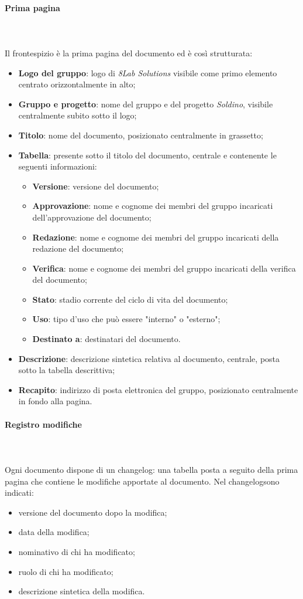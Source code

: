 		\paragraph{Prima pagina} \mbox{}\\ \mbox{}\\
		Il frontespizio è la prima pagina del documento ed è così strutturata:
		\begin{itemize}
			\item \textbf{Logo del gruppo}: logo di \textit{8Lab Solutions} visibile come primo elemento centrato orizzontalmente in alto;
			\item \textbf{Gruppo e progetto}: nome del gruppo e del progetto \textit{Soldino}, visibile centralmente subito sotto il logo;
			\item \textbf{Titolo}: nome del documento, posizionato centralmente in grassetto;
			\item \textbf{Tabella}: presente sotto il titolo del documento, centrale e contenente le seguenti informazioni:
			\begin{itemize}
				\item \textbf{Versione}: versione del documento;
				\item \textbf{Approvazione}: nome e cognome dei membri del gruppo incaricati dell'approvazione del documento;
				\item \textbf{Redazione}: nome e cognome dei membri del gruppo incaricati della redazione del documento;
				\item \textbf{Verifica}: nome e cognome dei membri del gruppo incaricati della verifica del documento;
				\item \textbf{Stato}: stadio corrente del ciclo di vita del documento;
				\item \textbf{Uso}: tipo d'uso che può essere "interno" o "esterno";
				\item \textbf{Destinato a}: destinatari del documento.
			\end{itemize}
			\item \textbf{Descrizione}: descrizione sintetica relativa al documento, centrale, posta sotto la tabella descrittiva;
			\item \textbf{Recapito}: indirizzo di posta elettronica del gruppo, posizionato centralmente in fondo alla pagina.
		\end{itemize}
		\paragraph{Registro modifiche} \mbox{}\\ \mbox{}\\
		Ogni documento dispone di un changelog\glo: una tabella posta a seguito della prima pagina che contiene le modifiche apportate al documento. Nel changelog\glosp sono indicati:
		\begin{itemize}
			\item versione del documento dopo la modifica;
			\item data della modifica;
			\item nominativo di chi ha modificato;
			\item ruolo di chi ha modificato;
			\item descrizione sintetica della modifica.
		\end{itemize}
